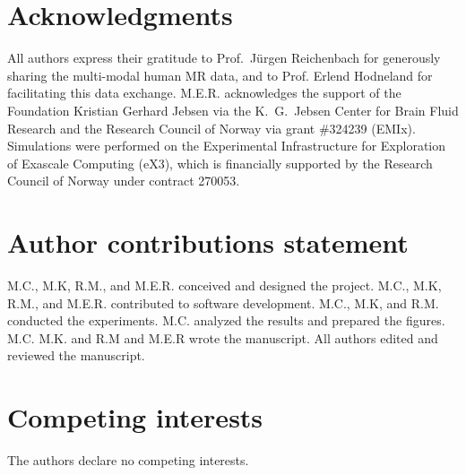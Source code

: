 \documentclass[fleqn,10pt]{wlscirep}
\begin{document}
\section*{Acknowledgments}

All authors express their gratitude to Prof.~Jürgen Reichenbach for
generously sharing the multi-modal human MR data, and to Prof. Erlend
Hodneland for facilitating this data exchange. M.E.R. acknowledges the
support of the Foundation Kristian Gerhard Jebsen via the K.~G.~Jebsen
Center for Brain Fluid Research and the Research Council of Norway via
grant \#324239 (EMIx). Simulations were performed on the Experimental
Infrastructure for Exploration of Exascale Computing (eX3), which is
financially supported by the Research Council of Norway under contract
270053.

\section*{Author contributions statement}

M.C., M.K, R.M., and M.E.R. conceived and designed the project.
M.C., M.K, R.M., and M.E.R. contributed to software development. 
M.C., M.K, and R.M. conducted the experiments.
M.C. analyzed the results and prepared the figures.
M.C. M.K. and R.M and M.E.R wrote the manuscript. 
All authors edited and reviewed the manuscript.

\section*{Competing interests}

The authors declare no competing interests.



\newpage
\FloatBarrier
\appendix


%
\end{document}
